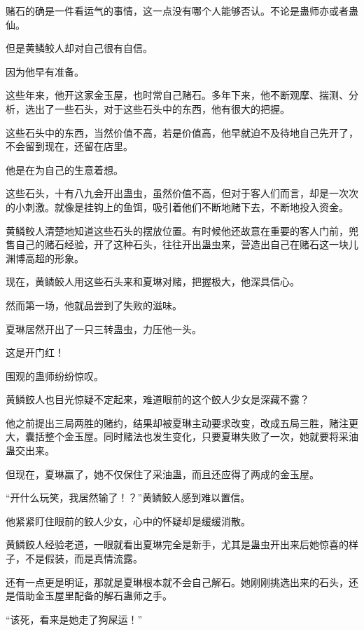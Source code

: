 
\begin{this_body}



赌石的确是一件看运气的事情，这一点没有哪个人能够否认。不论是蛊师亦或者蛊仙。

但是黄鳞鲛人却对自己很有自信。

因为他早有准备。

这些年来，他开这家金玉屋，也时常自己赌石。多年下来，他不断观摩、揣测、分析，选出了一些石头，对于这些石头中的东西，他有很大的把握。

这些石头中的东西，当然价值不高，若是价值高，他早就迫不及待地自己先开了，不会留到现在，还留在店里。

他是在为自己的生意着想。

这些石头，十有八九会开出蛊虫，虽然价值不高，但对于客人们而言，却是一次次的小刺激。就像是挂钩上的鱼饵，吸引着他们不断地赌下去，不断地投入资金。

黄鳞鲛人清楚地知道这些石头的摆放位置。有时候他还故意在重要的客人门前，兜售自己的赌石经验，开了这种石头，往往开出蛊虫来，营造出自己在赌石这一块儿渊博高超的形象。

现在，黄鳞鲛人用这些石头来和夏琳对赌，把握极大，他深具信心。

然而第一场，他就品尝到了失败的滋味。

夏琳居然开出了一只三转蛊虫，力压他一头。

这是开门红！

围观的蛊师纷纷惊叹。

黄鳞鲛人也目光惊疑不定起来，难道眼前的这个鲛人少女是深藏不露？

他之前提出三局两胜的赌约，结果却被夏琳主动要求改变，改成五局三胜，赌注更大，囊括整个金玉屋。同时赌法也发生变化，只要夏琳失败了一次，她就要将采油蛊交出来。

但现在，夏琳赢了，她不仅保住了采油蛊，而且还应得了两成的金玉屋。

“开什么玩笑，我居然输了！？”黄鳞鲛人感到难以置信。

他紧紧盯住眼前的鲛人少女，心中的怀疑却是缓缓消散。

黄鳞鲛人经验老道，一眼就看出夏琳完全是新手，尤其是蛊虫开出来后她惊喜的样子，不是假装，而是真情流露。

还有一点更是明证，那就是夏琳根本就不会自己解石。她刚刚挑选出来的石头，还是借助金玉屋里配备的解石蛊师之手。

“该死，看来是她走了狗屎运！”


\end{this_body}
